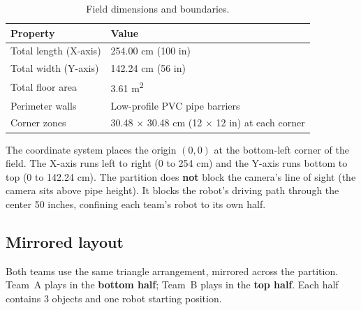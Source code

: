 \documentclass[a4]{article}
\begin{document}
\begin{table}[H]
\centering
\begin{tabular}{ll}
\toprule
\textbf{Property} & \textbf{Value} \\
\midrule
Total length (X-axis) & 254.00 cm (100 in) \\
Total width (Y-axis) & 142.24 cm (56 in) \\
Total floor area & 3.61 m\textsuperscript{2} \\
Perimeter walls & Low-profile PVC pipe barriers \\
Corner zones & 30.48 $\times$ 30.48 cm (12 $\times$ 12 in) at each corner \\
\bottomrule
\end{tabular}
\caption{Field dimensions and boundaries.}
\end{table}

The coordinate system places the origin $(0, 0)$ at the bottom-left corner of the field. The X-axis runs left to right (0 to 254 cm) and the Y-axis runs bottom to top (0 to 142.24 cm). The partition does \textbf{not} block the camera's line of sight (the camera sits above pipe height). It blocks the robot's driving path through the center 50 inches, confining each team's robot to its own half.

\subsection*{Mirrored layout}

Both teams use the same triangle arrangement, mirrored across the partition. Team~A plays in the \textbf{bottom half}; Team~B plays in the \textbf{top half}. Each half contains 3 objects and one robot starting position.
\end{document}
